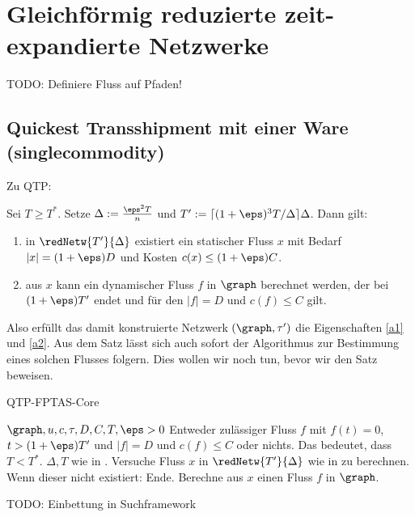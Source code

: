 \section{Gleichförmig reduzierte zeit-expandierte Netzwerke}\label{sec:unif_cond}

TODO: Definiere Fluss auf Pfaden!

\subsection{Quickest Transshipment mit einer Ware (singlecommodity)}

Zu QTP:
\begin{theorem}\label{theo:qtp_flow_ex}
    Sei $T \geq T^*$. Setze $\Delta := \frac{\eps^2 T}{n}$ und
    $T' := \lceil (1+\eps)^3 T / \Delta \rceil \Delta$.
    Dann gilt:
    \begin{enumerate}[label={\alph*)}]
        \item in $\redNetw{T'}{\Delta}$ existiert ein statischer Fluss $x$ mit
            Bedarf $|x| = (1 + \eps)D$ und Kosten $c(x) \leq (1+\eps)C$.
        \item aus $x$ kann ein dynamischer Fluss $f$ in $\graph$ berechnet werden,
            der bei $(1+\eps)T'$ endet und für den $|f| = D$ und $c(f) \leq C$
            gilt.
    \end{enumerate}
\end{theorem}

Also erfüllt das damit konstruierte Netzwerk $(\graph, \tau')$ die Eigenschaften
\ref{a1} und \ref{a2}. Aus dem Satz lässt sich auch sofort der Algorithmus
zur Bestimmung eines solchen Flusses folgern. Dies wollen wir noch tun,
bevor wir den Satz beweisen.

\begin{algorithm}
\caption{QTP-FPTAS-Core}
\label{alg:qtp_core}
\begin{algorithmic}[1]
    \REQUIRE $\graph, u, c, \tau, D, C, T, \eps > 0$
    \ENSURE Entweder zulässiger Fluss $f$ mit $f(t) = 0$, $t > (1+\eps) T'$
        und $|f| = D$ und $c(f) \leq C$ oder nichts. Das bedeutet, dass
        $T < T^*$.
    \STATE $\Delta, T$ wie in .
    \STATE Versuche Fluss $x$ in $\redNetw{T'}{\Delta}$ wie in 
        zu berechnen. Wenn dieser nicht existiert: Ende.
    \STATE Berechne aus $x$ einen Fluss $f$ in $\graph$.
\end{algorithmic}
\end{algorithm}

TODO: Einbettung in Suchframework

